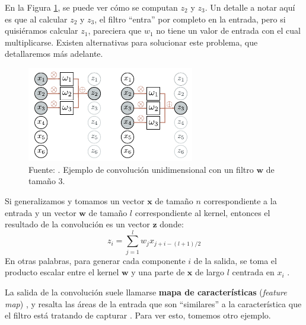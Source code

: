 \documentclass[../../main.tex]{subfiles}
\begin{document}
En la Figura \ref{fig:conv1d-example}, se puede ver cómo se computan \(z_2\) y \(z_3\). Un
detalle a notar aquí es que al calcular \(z_2\) y \(z_3\), el filtro ``entra'' por
completo en la entrada, pero si quisiéramos calcular \(z_1\), pareciera que \(w_1\) no
tiene un valor de entrada con el cual multiplicarse. Existen alternativas para solucionar
este problema, que detallaremos más adelante.

\begin{figure}
    \centering
    \includegraphics[width=0.65\textwidth]{figs/conv1d-example1.png}
    \caption{Fuente: \cite{prince2024understanding}. Ejemplo de convolución unidimensional
    con un filtro \(\bm{w}\) de tamaño 3.}
    \label{fig:conv1d-example}
\end{figure}

Si generalizamos y tomamos un vector \(\bm{x}\) de tamaño \(n\) correspondiente
a la entrada y un vector \(\bm{w}\) de tamaño \(l\) correspondiente al kernel,
entonces el resultado de la convolución es un vector \(\bm{z}\) donde:
\begin{equation}
    z_i = \sum_{j=1}^l w_j x_{j+i-(l+1)/2}
    \label{eq:convolution}
\end{equation}
En otras palabras, para generar cada componente \(i\) de la salida, se toma el producto
escalar entre el kernel \(\bm{w}\) y una parte de \(\bm{x}\) de largo \(l\) centrada en
\(x_i\) \cite{ai-a-modern-approach}.

La salida de la convolución suele llamarse \textbf{mapa de características}
(\textit{feature map}) \cite{deep-learning}, y resalta las áreas de la entrada que son
``similares'' a la característica que el filtro está tratando de capturar
\cite{hands-on-ML-sklearn-tf}. Para ver esto, tomemos otro ejemplo.
\end{document}
